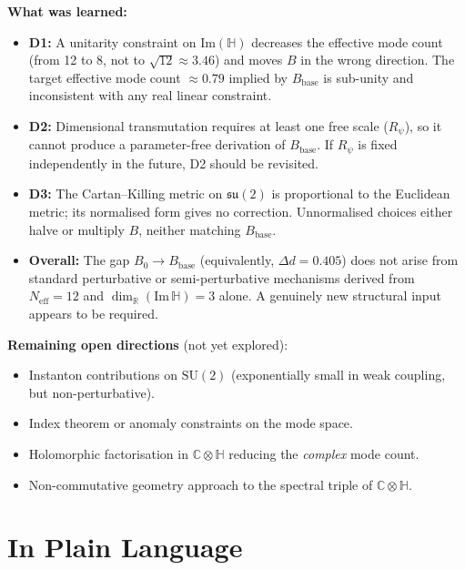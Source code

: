 \documentclass[11pt,a4paper]{article}
\theoremstyle{definition}
\theoremstyle{remark}
\begin{document}
\medskip\noindent\textbf{What was learned:}
\begin{itemize}
  \item \textbf{D1:} A unitarity constraint on $\mathrm{Im}(\mathbb{H})$
    decreases the effective mode count (from 12 to 8, not to $\sqrt{12} \approx 3.46$)
    and moves $B$ in the wrong direction.
    The target effective mode count $\approx 0.79$ implied by $B_{\mathrm{base}}$ is
    sub-unity and inconsistent with any real linear constraint.
  \item \textbf{D2:} Dimensional transmutation requires at least one free scale
    ($R_\psi$), so it cannot produce a parameter-free derivation of $B_{\mathrm{base}}$.
    If $R_\psi$ is fixed independently in the future, D2 should be revisited.
  \item \textbf{D3:} The Cartan--Killing metric on $\mathfrak{su}(2)$ is proportional
    to the Euclidean metric; its normalised form gives no correction.
    Unnormalised choices either halve or multiply $B$, neither matching $B_{\mathrm{base}}$.
  \item \textbf{Overall:} The gap $B_0 \to B_{\mathrm{base}}$ (equivalently,
    $\Delta d = 0.405$) does not arise from standard perturbative or semi-perturbative
    mechanisms derived from $N_{\mathrm{eff}} = 12$ and $\dim_\mathbb{R}(\mathrm{Im}\,\mathbb{H}) = 3$
    alone. A genuinely new structural input appears to be required.
\end{itemize}

\textbf{Remaining open directions} (not yet explored):
\begin{itemize}
  \item Instanton contributions on $\mathrm{SU}(2)$
    (exponentially small in weak coupling, but non-perturbative).
  \item Index theorem or anomaly constraints on the mode space.
  \item Holomorphic factorisation in $\mathbb{C}\otimes\mathbb{H}$ reducing the
    \emph{complex} mode count.
  \item Non-commutative geometry approach to the spectral triple of $\mathbb{C}\otimes\mathbb{H}$.
\end{itemize}

\section{In Plain Language}
\label{sec:plain}
\end{document}
